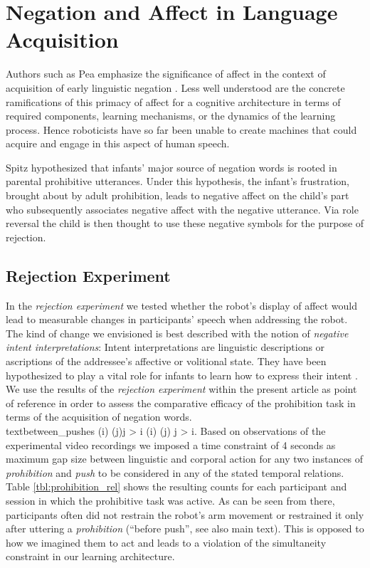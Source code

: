 \section{Negation and Affect in Language Acquisition}
\label{sec:negation_affect}
Authors such as Pea emphasize the significance of affect in the context of acquisition of early linguistic negation \cite{Pea1980}.
Less well understood are the concrete ramifications of this primacy of affect for a cognitive architecture in terms of required
components, learning mechanisms, or the dynamics of the learning process. Hence roboticists have so far been unable to create machines
that could acquire and engage in this aspect of human speech.

Spitz \cite{Spitz1957} hypothesized that infants' major source of negation words is rooted in parental prohibitive utterances. Under this hypothesis, the 
infant's frustration, brought about by adult prohibition, leads to negative affect on the child's part who subsequently associates negative affect 
with the negative utterance. Via role reversal the child is then thought to use these negative symbols for the purpose of rejection. 

\subsection{Rejection Experiment}
In the \emph{rejection experiment} \cite{Foerster2017} we tested whether the robot's display of affect would lead to measurable changes in participants' speech
when addressing the robot. The kind of change we envisioned is best described with the notion of \emph{negative intent interpretations}: Intent interpretations
are linguistic descriptions or ascriptions of the addressee's affective or volitional state. They have been hypothesized to play a vital role for infants
to learn how to express their intent \cite{Ryan1974,Pea1980}. We use the results of the \emph{rejection experiment} within the present article as point of
reference in order to assess the comparative efficacy of the prohibition task in terms of the acquisition of negation words.\\text{between\_pushes} \Leftrightarrow {}(i) \wedge {}(j)j > i \Leftrightarrow {}(i) \wedge {}(j) j > i.
Based on observations of the experimental video recordings we imposed a time constraint of 4 seconds as maximum gap size between
linguistic and corporal action for any two instances of \emph{prohibition} and \emph{push} to be considered in any of the stated temporal relations.
Table \ref{tbl:prohibition_rel} shows the resulting counts for each participant and session in which the prohibitive task was active. As can be seen from
there, participants often did not restrain the robot's arm movement or restrained it only after uttering a \emph{prohibition} (``before push'', see also main
text). This is opposed to how we imagined them to act and leads to a violation of the simultaneity constraint in our learning architecture.

